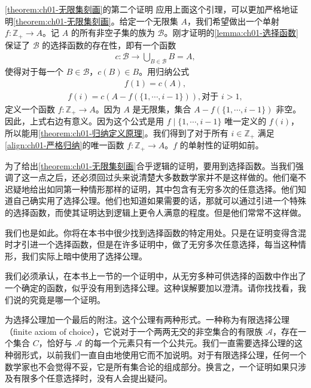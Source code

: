 \documentclass[../../main.tex]{subfiles}
\begin{document}
\cref{theorem:ch01-无限集刻画}的第二个证明 应用上面这个引理，可以更加严格地证明\cref{theorem:ch01-无限集刻画}。给定一个无限集 $A$，我们希望做出一个单射 $f: \mathbb{Z}_{+} \longrightarrow A$。记 $A$ 的所有非空子集的族为 $\mathcal{B}$。刚才证明的\cref{lemma:ch01-选择函数}保证了 $\mathcal{B}$ 的选择函数的存在性，即有一个函数
\begin{align*}
c: \mathcal{B} \longrightarrow \bigcup_{B \in \mathcal{B}} B = A,
\end{align*}
使得对于每一个 $B \in \mathcal{B}$，$c(B) \in B$。用归纳公式
\begin{align}
f(1) = c(A),\label{align:ch01-严格归纳}
\end{align}
\begin{align*}
f(i) = c(A - f(\{1, \cdots, i-1\})), \text{对于 } i > 1,
\end{align*}
定义一个函数 $f: \mathbb{Z}_{+} \longrightarrow A$。因为 $A$ 是无限集，集合 $A - f(\{1, \cdots, i-1\})$ 非空。因此，上式右边有意义。因为这个公式是用 $f \mid \{1, \cdots, i-1\}$ 唯一定义的 $f(i)$，所以能用\cref{theorem:ch01-归纳定义原理}。我们得到了对于所有 $i \in \mathbb{Z}_{+}$ 满足\eqref{align:ch01-严格归纳}的唯一函数 $f: \mathbb{Z}_{+} \longrightarrow A$。$f$ 的单射性的证明如前。

为了给出\cref{theorem:ch01-无限集刻画}合乎逻辑的证明，要用到选择函数。当我们强调了这一点之后，还必须回过头来说清楚大多数数学家并不是这样做的。他们毫不迟疑地给出如同第一种情形那样的证明，其中包含有无穷多次的任意选择。他们知道自己确实用了选择公理。他们也知道如果需要的话，那就可以通过引进一个特殊的选择函数，而使其证明达到逻辑上更令人满意的程度。但是他们常常不这样做。

我们也是如此。你将在本书中很少找到选择函数的特定用处。只是在证明变得含混时才引进一个选择函数，但是在许多证明中，做了无穷多次任意选择，每当这种情形，我们实际上暗中使用了选择公理。

我们必须承认，在本书上一节的一个证明中，从无穷多种可供选择的函数中作出了一个确定的函数，似乎没有用到选择公理。这种误解要加以澄清。请你找找看，我们说的究竟是哪一个证明。

为选择公理加一个最后的附注。这个公理有两种形式。一种称为有限选择公理（finite axiom of choice），它说对于一个两两无交的非空集合的有限族 $\mathcal{A}$，存在一个集合 $C$，恰好与 $\mathcal{A}$ 的每一个元素只有一个公共元。我们一直需要选择公理的这种弱形式，以前我们一直自由地使用它而不加说明。对于有限选择公理，任何一个数学家也不会觉得不妥，它是所有集合论的组成部分。换言之，一个证明如果只涉及有限多个任意选择时，没有人会提出疑问。
\end{document}
